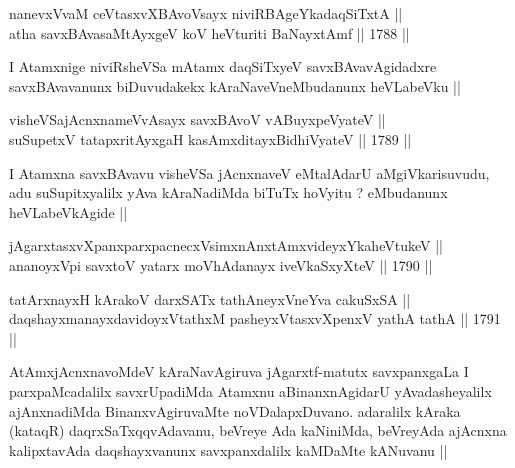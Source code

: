 

\begin{shl}
nanevxVvaM ceVtasxvXBAvoV\s sayx niviRBAgeYkadaqSiTxtA || \\
atha savxBAvasaMtAyxgeV koV heVturiti BaNayxtAmf ||  1788 ||  
\end{shl}

\begin{artha}
I Atamxnige niviRsheVSa mAtamx daqSiTxyeV savxBAvavAgidadxre
savxBAvavanunx biDuvudakekx kAraNaveVneMbudanunx heVLabeVku ||
\end{artha}

\begin{shl}
visheVSajAcnxnameVvAsayx savxBAvoV vA\s BuyxpeVyateV || \\
suSupetxV tatapxritAyxgaH kasAmxditayxBidhiVyateV ||  1789 ||  
\end{shl}

\begin{artha}
I Atamxna savxBAvavu visheVSa jAcnxnaveV eMtalAdarU aMgiVkarisuvudu,
adu suSupitxyalilx yAva kAraNadiMda biTuTx hoVyitu ? eMbudanunx
heVLabeVkAgide ||
\end{artha}


\begin{shl}
jAgarxtasxvXpanxparxpacnecxV\s simxnAnxtAmxvideyxYkaheVtukeV || \\
ananoyxV\s pi savxtoV yatarx moVhAdanayx iveVkaSxyXteV ||  1790 ||  
\end{shl}
				
\begin{shl}
tatArxnayxH kArakoV darxSATx tathA\s neyxVneYva cakuSxSA || \\
daqshayxmanayxdavidoyxVtathxM pasheyxVtasxvXpenxV yathA tathA ||  1791 ||  
\end{shl}

\begin{artha}
AtAmxjAcnxnavoMdeV kAraNavAgiruva jAgarxtf-matutx savxpanxgaLa I
parxpaMcadalilx savxrUpadiMda Atamxnu aBinanxnAgidarU yAvadasheyalilx
ajAnxnadiMda BinanxvAgiruvaMte noVDalapxDuvano. adaralilx kAraka
(kataqR) daqrxSaTxqqvAdavanu, beVreye Ada kaNiniMda, beVreyAda
ajAcnxna kalipxtavAda daqshayxvanunx savxpanxdalilx kaMDaMte kANuvanu ||
\end{artha}


